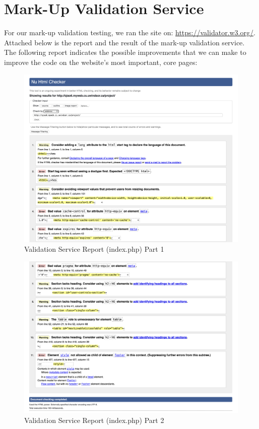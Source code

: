 \documentclass[12pt, letterpaper]{article}
\begin{document}
 \newpage

\section{Mark-Up Validation Service}

For our mark-up validation testing, we ran the site on: \url{https://validator.w3.org/}. Attached below is the report and the result of the mark-up validation service. The following report indicates the possible improvements that we can make to improve the code on the website's most important, core pages:

\begin{figure}[htbp]
	\centering
	\includegraphics[width=\textwidth]{images/27-report-1.png}
	\caption{Validation Service Report (index.php) Part 1}
 \end{figure}

 \begin{figure}[htbp]
	\centering
	\includegraphics[width=\textwidth]{images/27-report-2.png}
	\caption{Validation Service Report (index.php) Part 2}
 \end{figure}
\end{document}
